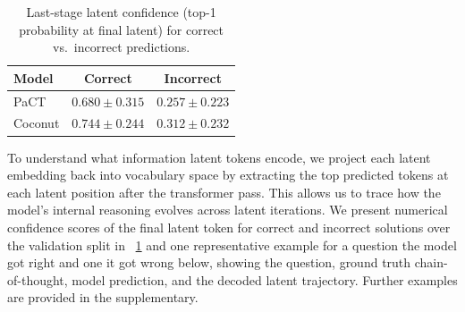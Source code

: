 
\begin{table}[H]
\centering
\small
\caption{Last-stage latent confidence (top-1 probability at final latent) for correct vs.\ incorrect predictions.}
\label{tab:latent_confidence}
\begin{tabular}{lcc}
\toprule
{Model} & {Correct} & {Incorrect} \\
\midrule
PaCT          & $0.680 \pm 0.315$ & $0.257 \pm 0.223$ \\
Coconut  & $0.744 \pm 0.244$ & $0.312 \pm 0.232$ \\
\bottomrule
\end{tabular}
\end{table}


To understand what information latent tokens encode, we project each latent embedding back into vocabulary space by extracting the top predicted tokens at each latent position after the transformer pass. This allows us to trace how the model's internal reasoning evolves across latent iterations. We present numerical confidence scores of the final latent token for correct and incorrect solutions over the validation split in ~\ref{tab:latent_confidence} and one representative example for a question the model got right and one it got wrong below, showing the question, ground truth chain-of-thought, model prediction, and the decoded latent trajectory. Further examples are provided in the supplementary.


